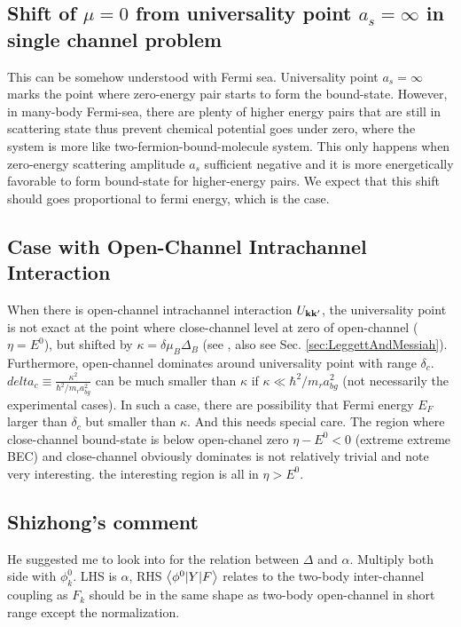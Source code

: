 \subsection{Shift of $\mu=0$ from universality point $a_s=\infty$ in single channel problem}
This can be somehow understood with Fermi sea. Universality point $a_s=\infty$ marks the point where zero-energy pair starts to form the bound-state.  However, in many-body Fermi-sea, there are plenty of higher energy pairs that are still in scattering state thus prevent chemical potential goes under zero, where the system is more like two-fermion-bound-molecule system.  This only happens when zero-energy scattering amplitude $a_s$ sufficient negative and it is more energetically favorable to form bound-state for higher-energy pairs.  We expect that this shift should goes proportional to fermi energy, which is the case.  

\subsection{Case with Open-Channel Intrachannel Interaction}
When there is open-channel intrachannel interaction $U_{\mathbf{k}\mathbf{k}'}$, the universality point is not exact at the point where close-channel level at zero of open-channel ($\eta=E^0$), but shifted by $\kappa=\delta\mu_B\Delta_B$ (see \cite{Leggett}, also see Sec. \ref{sec:LeggettAndMessiah}).  Furthermore, open-channel dominates around universality point with range $\delta_c$.  $delta_c\equiv\frac{\kappa^2}{\hbar^2/m_ra_{bg}^2}$ can be much smaller than $\kappa$ if $\kappa\ll\hbar^2/m_ra_{bg}^2$ (not necessarily the experimental cases).  In such a case, there are possibility that Fermi energy $E_F$ larger than $\delta_c$ but smaller than $\kappa$.  And this needs special care.  The region where close-channel bound-state is below open-chanel zero $\eta-E^0<0$ (extreme extreme BEC) and close-channel obviously dominates is not relatively trivial and note very interesting.  the interesting region is all in $\eta>E^0$.  

\subsection{Shizhong's comment}
He suggested me to look into  for the relation between $\Delta$ and $\alpha$. Multiply both side with $\phi^0_k$.  LHS is $\alpha$, RHS $\bigl<{\phi^0{\lvert{Y}\rvert}F}\bigr>$ relates to the two-body inter-channel coupling as $F_k$ should be in the same shape as two-body open-channel in short range except the normalization.  


